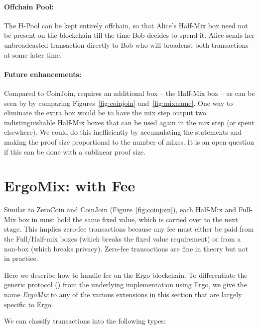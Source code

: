 \documentclass[runningheads]{llncs}
\newcommand{\mixname}{ErgoMix\xspace}
\begin{document}
\paragraph{Offchain Pool:} The H-Pool can be kept entirely offchain, so that Alice's Half-Mix box need not be present on the blockchain till the time Bob decides to spend it. Alice sends her unbroadcasted transaction directly to Bob who will broadcast both transactions at some later time. 


\paragraph{Future enhancements:} Compared to CoinJoin, \algname requires an additional box -- the Half-Mix box -- as can be seen by by comparing Figures~\ref{fig:coinjoin} and~\ref{fig:mixname}. One way to eliminate the extra box would be to have the mix step output two indistinguishable Half-Mix boxes that can be used again in the mix step (or spent elsewhere). We could do this inefficiently by accumulating the statements and making the proof size proportional to the number of mixes. It is an open question if this can be done with a sublinear proof size.

\section{\mixname: \algname with Fee}
\label{fee}

Similar to ZeroCoin and CoinJoin (Figure~\ref{fig:coinjoin}), each Half-Mix and Full-Mix box in \algname must hold the same fixed value, which is carried over to the next stage. This implies zero-fee transactions because any fee must either be paid from the Full/Half-mix boxes (which breaks the fixed value requirement) or from a non-\algname box (which breaks privacy). Zero-fee transactions are fine in theory but not in practice. %

Here we describe how to handle fee on the Ergo blockchain. To differentiate the generic protocol (\algname) from the underlying implementation using Ergo, we give the name {\em \mixname} to any of the various extensions in this section that are largely specific to Ergo. 

We can classify \algname transactions into the following types:
\end{document}

